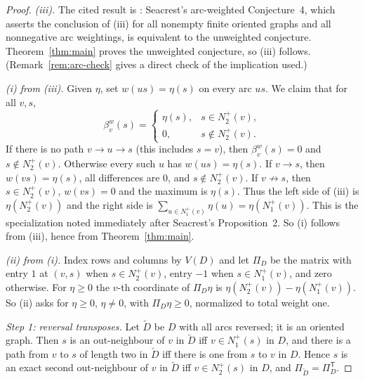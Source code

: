 \documentclass[11pt]{article}
\theoremstyle{remark}
\newcommand{\tp}{^{\mathsf T}}
\begin{document}
\begin{proof}
\emph{\textup{(iii)}.} The cited result is
\cite[Proposition~2]{Seacrest2015}: Seacrest's arc-weighted Conjecture~4,
which asserts the conclusion of \textup{(iii)} for all nonempty finite
oriented graphs and all nonnegative arc weightings, is equivalent to the
unweighted conjecture. Theorem~\ref{thm:main} proves the unweighted
conjecture, so \textup{(iii)} follows.
(Remark~\ref{rem:arc-check} gives a direct check of the implication used.)

\emph{\textup{(i)} from \textup{(iii)}.} Given $\eta$, set $w(us)=\eta(s)$
on every arc $us$. We claim that for all $v,s$,
\[
 \beta_v^w(s)=
 \begin{cases}
  \eta(s),&s\in N_2^+(v),\\
  0,&s\notin N_2^+(v).
 \end{cases}
\]
If there is no path $v\to u\to s$ (this includes $s=v$), then
$\beta_v^w(s)=0$ and $s\notin N_2^+(v)$. Otherwise every such $u$ has
$w(us)=\eta(s)$. If $v\to s$, then $w(vs)=\eta(s)$, all differences are
$0$, and $s\notin N_2^+(v)$. If $v\not\to s$, then $s\in N_2^+(v)$,
$w(vs)=0$ and the maximum is $\eta(s)$. Thus the left side of
\textup{(iii)} is $\eta(N_2^+(v))$ and the right side is
$\sum_{u\in N_1^+(v)}\eta(u)=\eta(N_1^+(v))$. This is the specialization
noted immediately after Seacrest's Proposition~2. So \textup{(i)} follows
from \textup{(iii)}, hence from Theorem~\ref{thm:main}.

\emph{\textup{(ii)} from \textup{(i)}.} Index rows and columns by $V(D)$
and let $\Pi_D$ be the matrix with entry $1$ at $(v,s)$ when
$s\in N_2^+(v)$, entry $-1$ when $s\in N_1^+(v)$, and zero otherwise. For
$\eta\ge0$ the $v$-th coordinate of $\Pi_D\eta$ is
$\eta(N_2^+(v))-\eta(N_1^+(v))$. So \textup{(ii)} asks for $\eta\ge0$,
$\eta\ne0$, with $\Pi_D\eta\ge0$, normalized to total weight one.

\emph{Step 1: reversal transposes.} Let $\overleftarrow D$ be $D$ with all
arcs reversed; it is an oriented graph. Then $s$ is an out-neighbour of $v$
in $\overleftarrow D$ iff $v\in N_1^+(s)$ in $D$, and there is a path from
$v$ to $s$ of length two in $\overleftarrow D$ iff there is one from $s$ to
$v$ in $D$. Hence $s$ is an exact second out-neighbour of $v$ in
$\overleftarrow D$ iff $v\in N_2^+(s)$ in $D$, and
$\Pi_{\overleftarrow D}=\Pi_D\tp$.


\end{proof}
\end{document}

